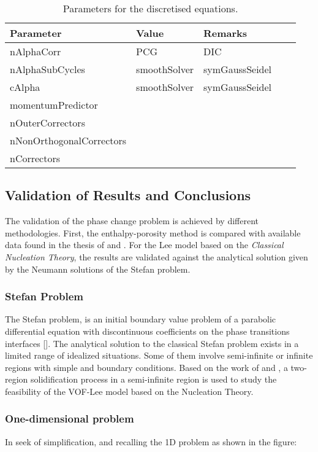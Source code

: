 \begin{table}[h!]
	\begin{tabular}{@{}lllll@{}}
		\toprule[1pt]
		\textbf{Parameter} & \textbf{Value} & \textbf{Remarks} & \\ \midrule[2pt]
		nAlphaCorr & PCG & DIC &  \\
		nAlphaSubCycles & smoothSolver & symGaussSeidel  &  \\
		cAlpha & smoothSolver & symGaussSeidel  &  \\
		momentumPredictor &      &    &  \\		 
		nOuterCorrectors &     &    &  \\ 
		nNonOrthogonalCorrectors &     &    &  \\ 		
		nCorrectors &    			       &    &  \\ \bottomrule[1pt]		
	\end{tabular}
	\centering
	\caption{Parameters for the discretised equations.}	
	\label{fig:boat5}
\end{table}
\subsection{Validation of Results and Conclusions}
The validation of the phase change problem is achieved by different methodologies. First, the enthalpy-porosity method is compared with available data found in the thesis of \cite{bourdillon_2016} and \cite{kowalewski_rebow_1999}. For the Lee model based on the \textit{Classical Nucleation Theory}, the results are validated against the analytical solution given by the Neumann solutions of the Stefan problem.


\subsubsection{Stefan Problem}
The Stefan problem, is an initial boundary value problem of a parabolic differential equation with discontinuous coefficients on the phase transitions interfaces [\cite{vasilyev_vasilyeva_2020}]. The analytical solution to the classical Stefan problem exists in a limited range of idealized situations. Some of them involve semi-infinite or infinite regions with simple and boundary conditions. Based on the work of \cite{vasilyev_vasilyeva_2020} and \cite{zhao_zhao_xu_2018}, a two-region solidification process in a semi-infinite region is used to study the feasibility of the VOF-Lee model based on the Nucleation Theory.
\subsubsection*{One-dimensional problem}
In seek of simplification, and recalling the 1D problem as shown in the figure:

